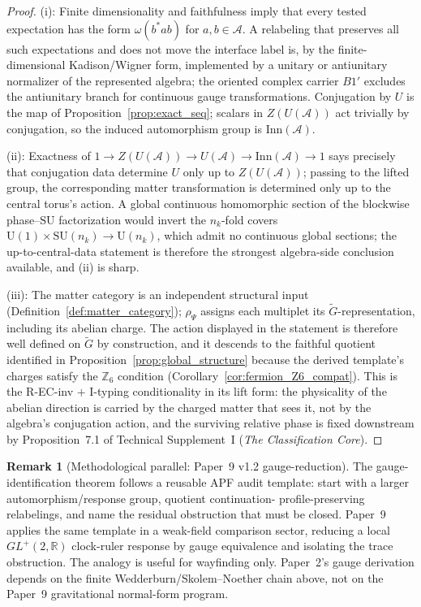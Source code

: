 \documentclass[11pt]{article}
\theoremstyle{definition}
\newtheorem{remark}[theorem]{Remark}
\newcommand{\SU}{\mathrm{SU}}
\newcommand{\U}{\mathrm{U}}
\newcommand{\TSI}{Technical Supplement~I (\emph{The Classification Core})}
\begin{document}
\begin{proof}
(i): Finite dimensionality and faithfulness imply that every tested
expectation has the form $\omega(b^*ab)$ for $a,b\in\mathcal A$.  A
relabeling that preserves all such expectations and does not move the
interface label is, by the finite-dimensional Kadison/Wigner form,
implemented by a unitary or antiunitary normalizer of the represented
algebra; the oriented complex carrier $B1'$ excludes the antiunitary
branch for continuous gauge transformations.  Conjugation by $U$ is the
map of Proposition~\ref{prop:exact_seq}; scalars in $Z(U(\mathcal A))$
act trivially by conjugation, so the induced automorphism group is
$\mathrm{Inn}(\mathcal A)$.

(ii): Exactness of $1 \to Z(U(\mathcal A)) \to U(\mathcal A) \to
\mathrm{Inn}(\mathcal A) \to 1$ says precisely that conjugation data
determine $U$ only up to $Z(U(\mathcal A))$; passing to the lifted
group, the corresponding matter transformation is determined only up to
the central torus's action.  A global continuous homomorphic section of
the blockwise phase--$\SU$ factorization would invert the $n_k$-fold
covers $\U(1)\times\SU(n_k) \to \U(n_k)$, which admit no continuous
global sections; the up-to-central-data statement is therefore the
strongest algebra-side conclusion available, and (ii) is sharp.

(iii): The matter category is an independent structural input
(Definition~\ref{def:matter_category}); $\rho_\Psi$ assigns each
multiplet its $\widetilde{G}$-representation, including its abelian
charge.  The action displayed in the statement is therefore well
defined on $\widetilde{G}$ by construction, and it descends to the
faithful quotient identified in Proposition~\ref{prop:global_structure}
because the derived template's charges satisfy the $\mathbb{Z}_6$
condition (Corollary~\ref{cor:fermion_Z6_compat}).  This is the
R-EC-inv $+$ I-typing conditionality in its lift form: the physicality
of the abelian direction is carried by the charged matter that sees it,
not by the algebra's conjugation action, and the surviving relative
phase is fixed downstream by Proposition~7.1 of \TSI{}.
\end{proof}

\begin{remark}[Methodological parallel: Paper~9 v1.2 gauge-reduction]\label{rem:p26_parallel}
The gauge-identification theorem follows a reusable APF audit template:
start with a larger automorphism/response group, quotient continuation-
profile-preserving relabelings, and name the residual obstruction that must
be closed.  Paper~9 applies the same template in a weak-field comparison
sector, reducing a local $GL^+(2,\mathbb R)$ clock-ruler response by gauge
equivalence and isolating the trace obstruction.  The analogy is useful for
wayfinding only.  Paper~2's gauge derivation depends on the finite
Wedderburn/Skolem--Noether chain above, not on the Paper~9 gravitational
normal-form program.
\end{remark}
\end{document}
